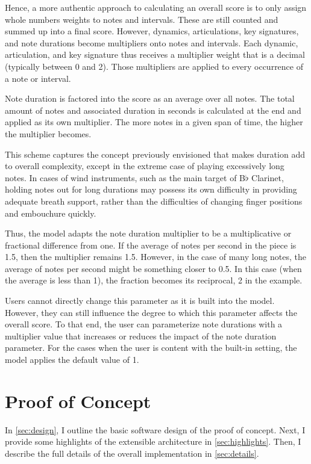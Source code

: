 \documentclass[12pt]{report}
\begin{document}
Hence, a more authentic approach to calculating an overall score is to only assign whole numbers weights to notes and intervals. These are still counted and summed up into a final score. However, dynamics, articulations, key signatures, and note durations become multipliers onto notes and intervals. Each dynamic, articulation, and key signature thus receives a multiplier weight that is a decimal (typically between 0 and 2). Those multipliers are applied to every occurrence of a note or interval.

Note duration is factored into the score as an average over all notes. The total amount of notes and associated duration in seconds is calculated at the end and applied as its own multiplier. The more notes in a given span of time, the higher the multiplier becomes.

This scheme captures the concept previously envisioned that makes duration add to overall complexity, except in the extreme case of playing excessively long notes. In cases of wind instruments, such as the main target of B$\flat$ Clarinet, holding notes out for long durations may possess its own difficulty in providing adequate breath support, rather than the difficulties of changing finger positions and embouchure quickly.

Thus, the model adapts the note duration multiplier to be a multiplicative or fractional difference from one. If the average of notes per second in the piece is 1.5, then the multiplier remains 1.5. However, in the case of many long notes, the average of notes per second might be something closer to 0.5. In this case (when the average is less than 1), the fraction becomes its reciprocal, 2 in the example.

Users cannot directly change this parameter as it is built into the model. However, they can still influence the degree to which this parameter affects the overall score. To that end, the user can parameterize note durations with a multiplier value that increases or reduces the impact of the note duration parameter. For the cases when the user is content with the built-in setting, the model applies the default value of 1.

\chapter{Proof of Concept} 
\label{sec:proof}

In \ref{sec:design}, I outline the basic software design of the proof of concept. Next, I provide some highlights of the extensible architecture in \ref{sec:highlights}. Then, I describe the full details of the overall implementation in \ref{sec:details}.
\end{document}
